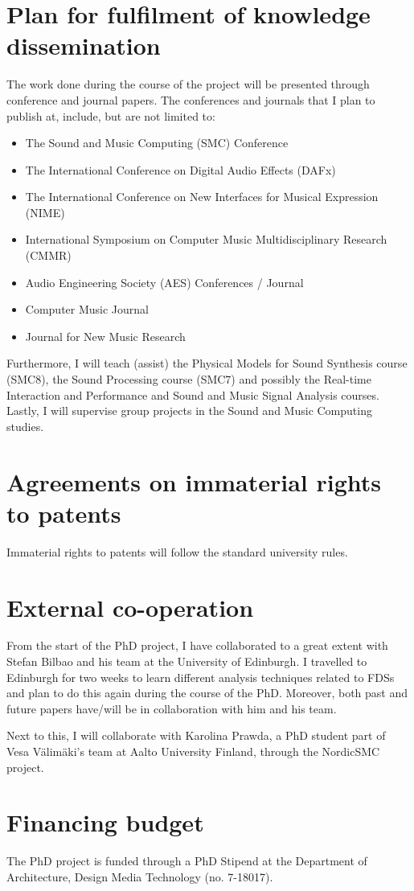 \section{Plan for fulfilment of knowledge dissemination}
The work done during the course of the project will be presented through conference and journal papers. The conferences and journals that I plan to publish at, include, but are not limited to:
\begin{itemize}
\item The Sound and Music Computing (SMC) Conference
\item The International Conference on Digital Audio Effects (DAFx)
\item The International Conference on New Interfaces for Musical Expression (NIME)
\item International Symposium on Computer Music Multidisciplinary Research (CMMR)
\item Audio Engineering Society (AES) Conferences / Journal
\item Computer Music Journal
\item Journal for New Music Research
\end{itemize}
Furthermore, I will teach (assist) the Physical Models for Sound Synthesis course (SMC8), the Sound Processing course (SMC7) and possibly the Real-time Interaction and Performance and Sound and Music Signal Analysis courses. Lastly, I will supervise group projects in the Sound and Music Computing studies.

\section{Agreements on immaterial rights to patents}
Immaterial rights to patents will follow the standard university rules.

\section{External co-operation}
From the start of the PhD project,  I have collaborated to a great extent with Stefan Bilbao and his team at the University of Edinburgh. I travelled to Edinburgh for two weeks to learn different analysis techniques related to FDSs and plan to do this again during the course of the PhD. Moreover, both past and future papers have/will be in collaboration with him and his team.

Next to this, I will collaborate with Karolina Prawda, a PhD student part of Vesa V\"alim\"aki's team at Aalto University Finland, through the NordicSMC project.

\section{Financing budget}
The PhD project is funded through a PhD Stipend at the Department of Architecture, Design Media Technology (no. 7-18017).
